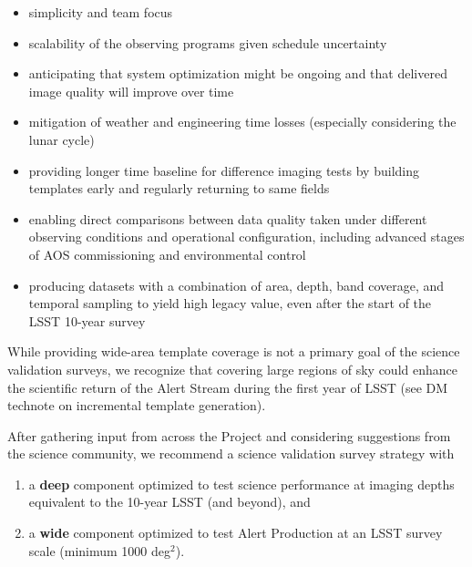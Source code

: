 \documentclass[SE,authoryear,toc,lsstdraft]{lsstdoc}
\begin{document}
\begin{itemize}

  \item simplicity and team focus

  \item scalability of the observing programs given schedule uncertainty

  \item anticipating that system optimization might be ongoing and that delivered image quality will improve over time

  \item mitigation of weather and engineering time losses (especially considering the lunar cycle)

  \item providing longer time baseline for difference imaging tests by building templates early and regularly returning to same fields

  \item enabling direct comparisons between data quality taken under different observing conditions and operational configuration, including advanced stages of AOS commissioning and environmental control

  \item producing datasets with a combination of area, depth, band coverage, and temporal sampling to yield high legacy value, even after the start of the LSST 10-year survey

\end{itemize}

While providing wide-area template coverage is not a primary goal of the science validation surveys, we recognize that covering large regions of sky could enhance the scientific return of the Alert Stream during the first year of LSST (see DM technote on incremental template generation).

After gathering input from across the Project and considering suggestions from the science community, we recommend a science validation survey strategy with

\begin{enumerate}

  \item a \textbf{deep} component optimized to test science performance at imaging depths equivalent to the 10-year LSST (and beyond), and

  \item a \textbf{wide} component optimized to test Alert Production at an LSST survey scale (minimum 1000 deg$^2$).

\end{enumerate}
\end{document}
